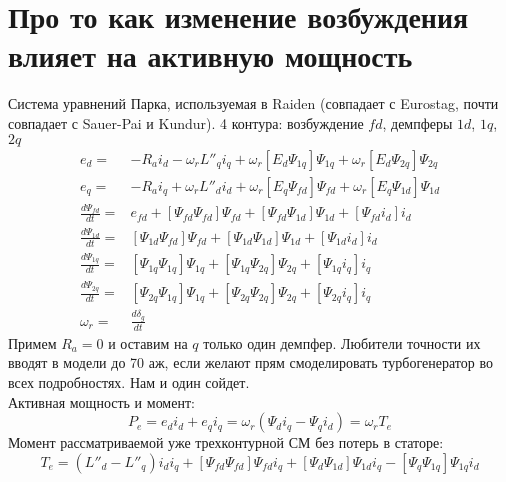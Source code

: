 \documentclass[lettersize,journal]{IEEEtran}
\begin{document}
	\section{Про то как изменение возбуждения влияет на активную мощность}
	Система уравнений Парка, используемая в Raiden (совпадает с Eurostag, почти совпадает с Sauer-Pai и Kundur). 4 контура: возбуждение \(fd\), демпферы \(1d\), \(1q\), \(2q\)
	\begin{subequations}
		\label{park3c}
		\begin{align}
			e_d =& -R_ai_d - \omega_rL''_qi_q + \omega_r[E_d\Psi_{1q}]\Psi_{1q} + \omega_r[E_d\Psi_{2q}]\Psi_{2q} \label{eqn:line-1} \\
			e_q =& -R_ai_q + \omega_rL''_di_d + \omega_r[E_q\Psi_{fd}]\Psi_{fd} + \omega_r[E_q\Psi_{1d}]\Psi_{1d} \label{eqn:line-2} \\
			\frac{d\Psi_{fd}}{dt} =& e_{fd} + [\Psi_{fd}\Psi_{fd}]\Psi_{fd} + [\Psi_{fd}\Psi_{1d}]\Psi_{1d} + [\Psi_{fd}i_d]i_d \label{eqn:line-3} \\
			\frac{d\Psi_{1d}}{dt} =& [\Psi_{1d}\Psi_{fd}]\Psi_{fd} + [\Psi_{1d}\Psi_{1d}]\Psi_{1d} + [\Psi_{1d}i_d]i_d \label{eqn:line-4} \\
			\frac{d\Psi_{1q}}{dt} =& [\Psi_{1q}\Psi_{1q}]\Psi_{1q} + [\Psi_{1q}\Psi_{2q}]\Psi_{2q} + [\Psi_{1q}i_q]i_q \label{eqn:line-5} \\
			\frac{d\Psi_{2q}}{dt} =& [\Psi_{2q}\Psi_{1q}]\Psi_{1q} + [\Psi_{2q}\Psi_{2q}]\Psi_{2q} + [\Psi_{2q}i_q]i_q \label{eqn:line-6} \\
			\omega_r =& \frac{d\delta_g}{dt} \label{eqn:line-6} 
		\end{align}
		\label{eqn:all-lines}
	\end{subequations}
	Примем \(R_a=0\) и оставим на \(q\) только один демпфер. Любители точности их вводят в модели до 70 аж, если желают прям смоделировать турбогенератор во всех подробностях. Нам и один сойдет.\\
	Активная мощность и момент:
	\begin{equation}
			P_e = e_di_d + e_qi_q = \omega_r(\Psi_di_q-\Psi_qi_d) = \omega_rT_e
	\end{equation}
	Момент рассматриваемой уже трехконтурной СМ без потерь в статоре:
	\begin{equation}
		\label{torque}
		T_e = (L''_d - L''_q)i_di_q+[\Psi_{fd}\Psi_{fd}]\Psi_{fd}i_q+[\Psi_d\Psi_{1d}]\Psi_{1d}i_q - [\Psi_q\Psi_{1q}]\Psi_{1q}i_d
	\end{equation}
\end{document}
